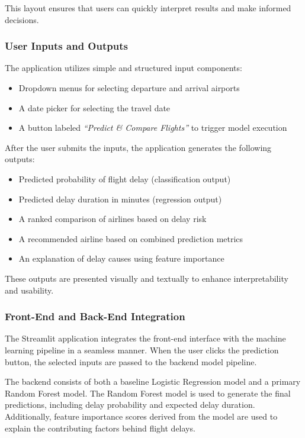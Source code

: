 This layout ensures that users can quickly interpret results and make informed decisions.

\subsubsection{User Inputs and Outputs}

The application utilizes simple and structured input components:

\begin{itemize}
    \item Dropdown menus for selecting departure and arrival airports
    \item A date picker for selecting the travel date
    \item A button labeled \textit{``Predict \& Compare Flights''} to trigger model execution
\end{itemize}

After the user submits the inputs, the application generates the following outputs:

\begin{itemize}
    \item Predicted probability of flight delay (classification output)
    \item Predicted delay duration in minutes (regression output)
    \item A ranked comparison of airlines based on delay risk
    \item A recommended airline based on combined prediction metrics
    \item An explanation of delay causes using feature importance
\end{itemize}

These outputs are presented visually and textually to enhance interpretability and usability.

\subsubsection{Front-End and Back-End Integration}

The Streamlit application integrates the front-end interface with the machine learning pipeline in a seamless manner. When the user clicks the prediction button, the selected inputs are passed to the backend model pipeline.

The backend consists of both a baseline Logistic Regression model and a primary Random Forest model. The Random Forest model is used to generate the final predictions, including delay probability and expected delay duration. Additionally, feature importance scores derived from the model are used to explain the contributing factors behind flight delays.

